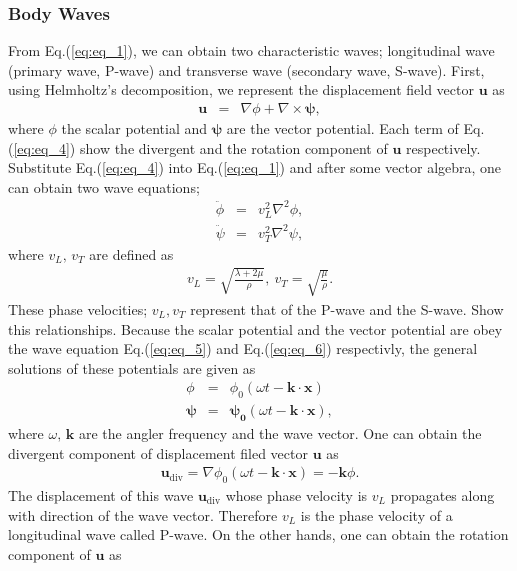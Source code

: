 \subsubsection{Body Waves}
From Eq.(\ref{eq:eq_1}), we can obtain two characteristic waves; longitudinal wave (primary wave, P-wave) and transverse wave (secondary wave, S-wave). First, using Helmholtz's decomposition, we represent the displacement field vector $\bm{u}$ as
\begin{eqnarray} 
  \bm{u} &=& \nabla\phi + \nabla\times\bm{\psi}, \label{eq:eq_4}
\end{eqnarray}
where $\phi$ the scalar potential and $\bm{\psi}$ are the vector potential. Each term of Eq.(\ref{eq:eq_4}) show the divergent and the rotation component of $\bm{u}$ respectively. Substitute Eq.(\ref{eq:eq_4}) into Eq.(\ref{eq:eq_1}) and after some vector algebra, one can obtain two wave equations;
\begin{eqnarray}
  \ddot{\phi} &=& v_{L}^2\nabla^2\phi \label{eq:eq_5},\\
  \ddot{\psi} &=& v_{T}^2\nabla^2\psi \label{eq:eq_6}, 
\end{eqnarray}
where $v_{L},\,v_{T}$ are defined as 
\begin{eqnarray}
  v_{L} = \sqrt{\frac{\lambda+2\mu}{\rho}},\
  v_{T} = \sqrt{\frac{\mu}{\rho}}. \label{eq:eq_7}
\end{eqnarray} 
These phase velocities; $v_{L},v_{T}$ represent that of the P-wave and the S-wave. Show this relationships. Because the scalar potential and the vector potential are obey the wave equation Eq.(\ref{eq:eq_5}) and Eq.(\ref{eq:eq_6}) respectivly, the general solutions of these potentials are given as
\begin{eqnarray}
  \phi &=& \phi_{0}(\omega{t}-\bm{k}\cdot{\bm{x}}) \label{eq:eq_8}\\
  \bm{\psi} &=& \bm{\psi_{0}}(\omega{t}-\bm{k}\cdot{\bm{x}}) \label{eq:eq_9},
\end{eqnarray}
where $\omega,\,\bm{k}$ are the angler frequency and the wave vector. One can obtain the divergent component of displacement filed vector $\bm{u}$ as
\begin{eqnarray}
  \bm{u}_{\mathrm{div}} = \nabla{\phi_{0}(\omega{t}-\bm{k}\cdot{\bm{x}})} =-\bm{k}{\phi}.
\end{eqnarray}
The displacement of this wave $\bm{u}_{\mathrm{div}}$ whose phase velocity is $v_{L}$ propagates along with direction of the wave vector. Therefore $v_{L}$ is the phase velocity of a longitudinal wave called P-wave. On the other hands, one can obtain the rotation component of $\bm{u}$ as

